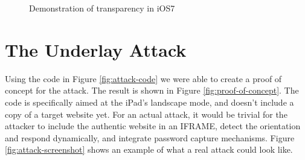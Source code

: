 \documentclass[twoside,letterpaper]{soups}
\begin{document}
\begin{figure}
\centering
{}
\mbox{}
\caption{Demonstration of transparency in iOS7}
\label{fig:example-transparency}
\end{figure}

\section{The Underlay Attack}\label{chap:attack}

Using the code in Figure \ref{fig:attack-code} we were able to create a proof of concept for the attack. The result is shown in Figure \ref{fig:proof-of-concept}. The code is specifically aimed at the iPad's landscape mode, and doesn't include a copy of a target website yet. For an actual attack, it would be trivial for the attacker to include the authentic website in an IFRAME, detect the orientation and respond dynamically, and integrate password capture mechanisms. Figure \ref{fig:attack-screenshot} shows an example of what a real attack could look like.
\end{document}
